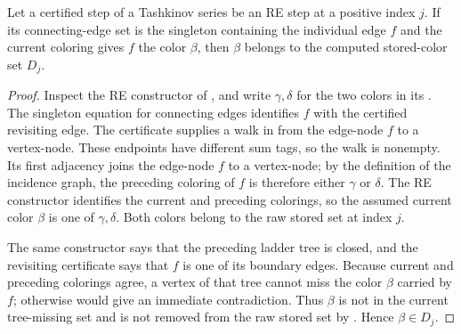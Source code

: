 \begin{lemma}
Let a certified step of a Tashkinov series be an RE step at a positive
index $j$.  If its connecting-edge set is the singleton containing the
individual edge $f$ and the current coloring gives $f$ the color
$\beta$, then $\beta$ belongs to the computed stored-color set $D_j$.
\end{lemma}
\begin{proof}
Inspect the RE constructor of , and write
$\gamma,δ$ for the two colors in its
.  The singleton equation for
connecting edges identifies $f$ with the certified revisiting edge.
The certificate supplies a walk in
 from the edge-node $f$ to a vertex-node.
These endpoints have different sum tags, so the walk is nonempty.  Its
first adjacency joins the edge-node $f$ to a vertex-node; by the
definition of the incidence graph, the preceding coloring of $f$ is
therefore either $\gamma$ or $\delta$.  The RE constructor identifies
the current and preceding colorings, so the assumed current color
$\beta$ is one of $\gamma,δ$.  Both colors belong to the raw stored set
at index $j$.

The same constructor says that the preceding ladder tree is closed, and
the revisiting certificate says that $f$ is one of its boundary edges.
Because current and preceding colorings agree, a vertex of that tree
cannot miss the color $\beta$ carried by $f$; otherwise
 would give an immediate contradiction.
Thus $\beta$ is not in the current tree-missing set and is not removed
from the raw stored set by .  Hence
$\beta\in D_j$.
\end{proof}
